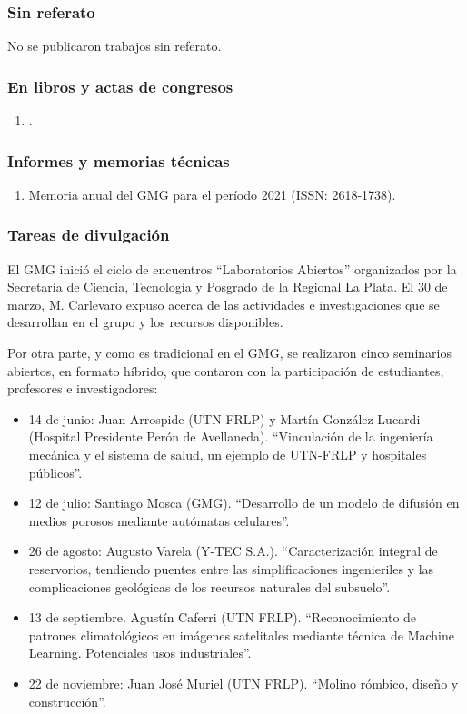 \documentclass[a4paper,11pt,twoside,final,titlepage,onecolumn,openright]{report}
\begin{document}
\subsubsection{Sin referato}
No se publicaron trabajos sin referato.

\subsubsection{En libros y actas de congresos}

\begin{enumerate}
    \item {}.
\end{enumerate}

\subsubsection{Informes y memorias técnicas}
\begin{enumerate}
 \item Memoria anual del GMG para el período 2021 (ISSN: 2618-1738).
\end{enumerate}


\subsubsection{Tareas de divulgación}

El GMG inició el ciclo de encuentros ``Laboratorios Abiertos'' organizados por la Secretaría de Ciencia, Tecnología y Posgrado de la Regional La Plata. El 30 de marzo, M. Carlevaro expuso acerca de las actividades e investigaciones que se desarrollan en el grupo y los recursos disponibles.

Por otra parte, y como es tradicional en el GMG, se realizaron cinco seminarios abiertos, en formato híbrido, que contaron con la participación de estudiantes, profesores e investigadores:
\begin{itemize}
    \item 14 de junio: Juan Arrospide (UTN FRLP) y Martín González Lucardi (Hospital Presidente Perón de Avellaneda). ``Vinculación de la ingeniería mecánica y el sistema de salud, un ejemplo de UTN-FRLP y hospitales públicos''.
    \item 12 de julio: Santiago Mosca (GMG). ``Desarrollo de un modelo de difusión en medios porosos mediante autómatas celulares''.
    \item 26 de agosto: Augusto Varela (Y-TEC S.A.). ``Caracterización integral de reservorios, tendiendo puentes entre las simplificaciones ingenieriles y las complicaciones geológicas de los recursos naturales del subsuelo''.
    \item 13 de septiembre. Agustín Caferri (UTN FRLP). ``Reconocimiento de patrones climatológicos en imágenes satelitales mediante técnica de Machine Learning. Potenciales usos industriales''.
    \item 22 de noviembre: Juan José Muriel (UTN FRLP). ``Molino rómbico, diseño y construcción''.
\end{itemize}
\end{document}
